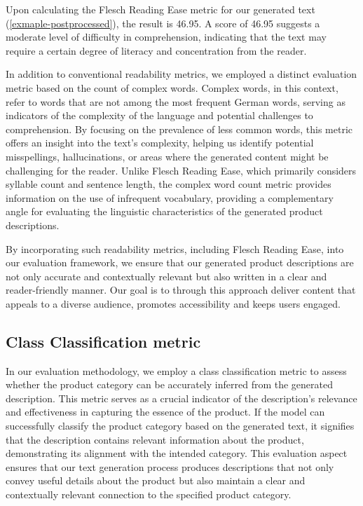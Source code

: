 Upon calculating the Flesch Reading Ease metric for our generated text (\autoref{exmaple-postprocessed}), the result is 46.95. A score of 46.95 suggests a moderate level of difficulty in comprehension, indicating that the text may require a certain degree of literacy and concentration from the reader. 

In addition to conventional readability metrics, we employed a distinct evaluation metric based on the count of complex words. Complex words, in this context, refer to words that are not among the most frequent German words, serving as indicators of the complexity of the language and potential challenges to comprehension. By focusing on the prevalence of less common words, this metric offers an insight into the text's complexity, helping us identify potential misspellings, hallucinations, or areas where the generated content might be challenging for the reader. Unlike Flesch Reading Ease, which primarily considers syllable count and sentence length, the complex word count metric provides information on the use of infrequent vocabulary, providing a complementary angle for evaluating the linguistic characteristics of the generated product descriptions.

By incorporating such readability metrics, including Flesch Reading Ease, into our evaluation framework, we ensure that our generated product descriptions are not only accurate and contextually relevant but also written in a clear and reader-friendly manner. Our goal is to through this approach deliver content that appeals to a diverse audience, promotes accessibility and keeps users engaged.

\subsection{Class Classification metric}


In our evaluation methodology, we employ a class classification metric to assess whether the product category can be accurately inferred from the generated description. This metric serves as a crucial indicator of the description's relevance and effectiveness in capturing the essence of the product. If the model can successfully classify the product category based on the generated text, it signifies that the description contains relevant information about the product, demonstrating its alignment with the intended category. This evaluation aspect ensures that our text generation process produces descriptions that not only convey useful details about the product but also maintain a clear and contextually relevant connection to the specified product category.


